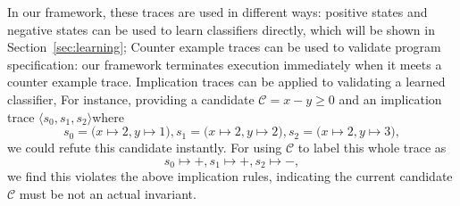 In our framework, these traces are used in different ways:
positive states and negative states can be used to learn classifiers directly,
which will be shown in Section~\ref{sec:learning};
Counter example traces can be used to validate program specification:
our framework terminates execution immediately when it meets a counter example trace.
Implication traces can be applied to validating a learned classifier,
For instance, providing a candidate $\mathcal{C} = x - y \ge 0$ and an implication trace
$\langle s_0, s_1, s_2\rangle$where
$$s_0 = \big(x \mapsto 2, y \mapsto 1\big),  s_1 = \big(x \mapsto 2, y \mapsto 2\big),  s_2 = \big(x \mapsto 2, y \mapsto 3\big),$$
we could refute this candidate instantly.
For using $\mathcal{C}$ to label this whole trace as $$s_0 \mapsto +,  s_1 \mapsto +,  s_2 \mapsto -,$$
we find this violates the above implication rules,
indicating the current candidate $\mathcal{C}$ must be not an actual invariant.













